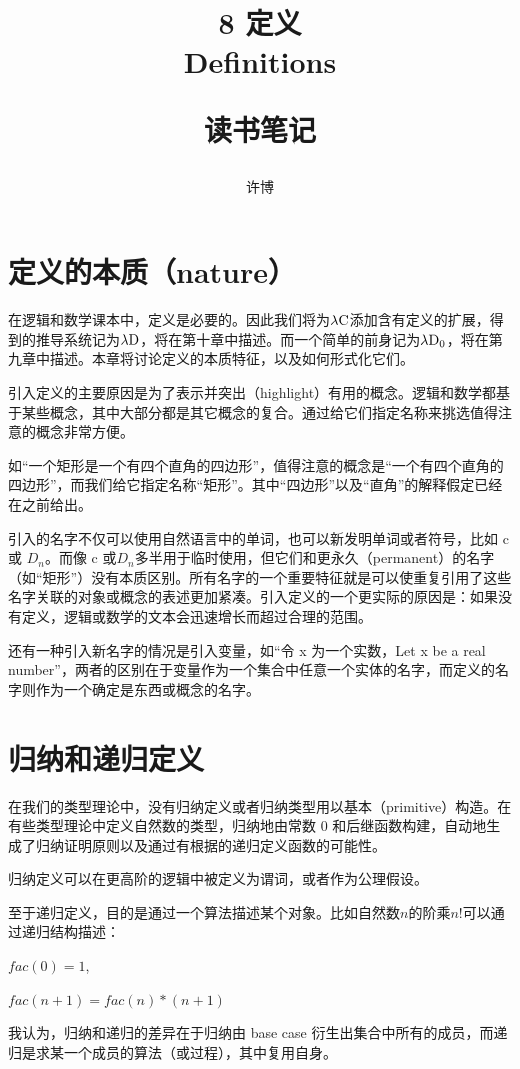 \documentclass[UTF8]{article}
\title{8 定义\\Definitions\\[2ex]\begin{large}读书笔记\end{large}}
\author{许博}
\date{}
\begin{document}
\maketitle
	\section{定义的本质（nature）}
	\noindent
	在逻辑和数学课本中，定义是必要的。因此我们将为$\lambda{\rm C}$添加含有定义的扩展，得到的推导系统记为$\lambda{\rm D}$，将在第十章中描述。而一个简单的前身记为$\lambda{\rm D_0}$，将在第九章中描述。本章将讨论定义的本质特征，以及如何形式化它们。
	
		引入定义的主要原因是为了表示并突出（highlight）有用的概念。逻辑和数学都基于某些概念，其中大部分都是其它概念的复合。通过给它们指定名称来挑选值得注意的概念非常方便。
		
		如“一个矩形是一个有四个直角的四边形”，值得注意的概念是“一个有四个直角的四边形”，而我们给它指定名称“矩形”。其中“四边形”以及“直角”的解释假定已经在之前给出。
		
		引入的名字不仅可以使用自然语言中的单词，也可以新发明单词或者符号，比如 c 或 $D_n$。而像 c 或$D_n$多半用于临时使用，但它们和更永久（permanent）的名字（如“矩形”）没有本质区别。所有名字的一个重要特征就是可以使重复引用了这些名字关联的对象或概念的表述更加紧凑。引入定义的一个更实际的原因是：如果没有定义，逻辑或数学的文本会迅速增长而超过合理的范围。
		
		还有一种引入新名字的情况是引入变量，如“令 x 为一个实数，Let x be a real number”，两者的区别在于变量作为一个集合中任意一个实体的名字，而定义的名字则作为一个确定是东西或概念的名字。
	
	\section{归纳和递归定义}
	\noindent
	在我们的类型理论中，没有归纳定义或者归纳类型用以基本（primitive）构造。在有些类型理论中定义自然数的类型，归纳地由常数 0 和后继函数构建，自动地生成了归纳证明原则以及通过有根据的递归定义函数的可能性。
	
		归纳定义可以在更高阶的逻辑中被定义为谓词，或者作为公理假设。
		
		至于递归定义，目的是通过一个算法描述某个对象。比如自然数$n$的阶乘$n!$可以通过递归结构描述：
		
		$fac(0) = 1$,
		
		$fac(n+1)=fac(n)*(n+1)$
		
		我认为，归纳和递归的差异在于归纳由 base case 衍生出集合中所有的成员，而递归是求某一个成员的算法（或过程），其中复用自身。
		
\end{document}
